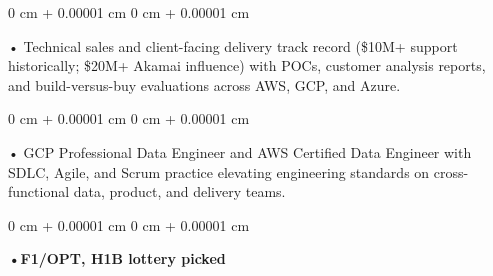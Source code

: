 \documentclass[10pt, letterpaper]{article}
\newenvironment{onecolentry}{
    \begin{adjustwidth}{
        0 cm + 0.00001 cm
    }{
        0 cm + 0.00001 cm
    }
}{
    \end{adjustwidth}
} %
\begin{document}
        \begin{onecolentry}
            • Technical sales and client-facing delivery track record (\$10M+ support historically; \$20M+ Akamai influence) with POCs, customer analysis reports, and build-versus-buy evaluations across AWS, GCP, and Azure.
        \end{onecolentry}
        \begin{onecolentry}
            • GCP Professional Data Engineer and AWS Certified Data Engineer with SDLC, Agile, and Scrum practice elevating engineering standards on cross-functional data, product, and delivery teams.
        \end{onecolentry}
        \begin{onecolentry}
                \textbf{•F1/OPT, H1B lottery picked}
        \end{onecolentry}

    \vspace{2 pt }
\end{document}
